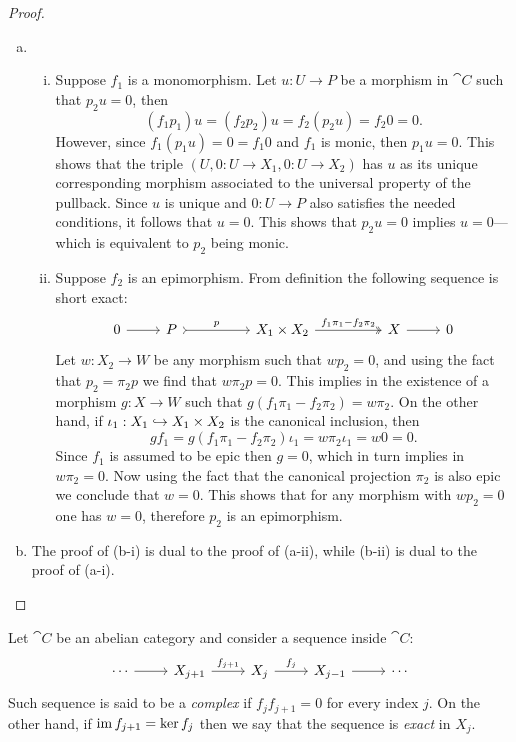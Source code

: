 \begin{proof}
\begin{enumerate}[(a)]\setlength\itemsep{0em}
\item
  \begin{enumerate}[(i)]\setlength\itemsep{0em}
  \item Suppose \(f_1\) is a monomorphism. Let \(u: U \to P\) be a morphism in
    \(\cat C\) such that \(p_2 u = 0\), then
    \[
    (f_1 p_1) u = (f_2 p_2) u = f_2 (p_2 u) = f_2 0 = 0.
    \]
    However, since \(f_1 (p_1 u) = 0 = f_1 0\) and \(f_1\) is monic, then
    \(p_1 u = 0\). This shows that the triple \((U, 0: U \to X_1, 0: U \to X_2)\)
    has \(u\) as its unique corresponding morphism associated to the universal
    property of the pullback. Since \(u\) is unique and \(0: U \to P\) also
    satisfies the needed conditions, it follows that \(u = 0\). This shows that
    \(p_2 u = 0\) implies \(u = 0\)---which is equivalent to \(p_2\) being monic.

  \item Suppose \(f_2\) is an epimorphism. From definition the following
    sequence is short exact:
    \[
    \begin{tikzcd}
    0 \ar[r]
    &P \ar[rr, "p", tail]
    &&X_1 \times X_2 \ar[rr, "f_1 \pi_1 - f_2 \pi_2", two heads]
    &&X \ar[r]
    &0
    \end{tikzcd}
    \]
    Let \(w: X_2 \to W\) be any morphism such that \(w p_2 = 0\), and using the
    fact that \(p_2 = \pi_2 p\) we find that \(w \pi_2 p = 0\). This implies in the
    existence of a morphism \(g: X \to W\) such that
    \(g (f_1 \pi_1 - f_2 \pi_2) = w \pi_2\). On the other hand, if \(\iota_1: X_1 \hookrightarrow X_1
    \times X_2\) is the canonical inclusion, then
    \[
    g f_1 = g (f_1 \pi_1 - f_2 \pi_2) \iota_1 = w \pi_2 \iota_1 = w 0 = 0.
    \]
    Since \(f_1\) is assumed to be epic then \(g = 0\), which in turn implies in
    \(w \pi_2 = 0\). Now using the fact that the canonical projection \(\pi_2\) is
    also epic we conclude that \(w = 0\). This shows that for any morphism with
    \(w p_2 = 0\) one has \(w = 0\), therefore \(p_2\) is an epimorphism.
  \end{enumerate}

\item The proof of (b-i) is dual to the proof of (a-ii), while (b-ii) is dual to
  the proof of (a-i).
\end{enumerate}
\end{proof}

\begin{definition}
\label{def:abelian-cat-complex-exact-sequence}
Let \(\cat C\) be an abelian category and consider a sequence inside \(\cat C\):
\[
\begin{tikzcd}
\cdots \ar[r]
&X_{j+1} \ar[r, "f_{j+1}"]
&X_j \ar[r, "f_j"]
&X_{j-1} \ar[r]
&\cdots
\end{tikzcd}
\]
Such sequence is said to be a \emph{complex} if \(f_j f_{j+1} = 0\) for every
index \(j\). On the other hand, if \(\operatorname{im} f_{j+1} = \ker f_j\) then we say that
the sequence is \emph{exact} in \(X_j\).
\end{definition}

